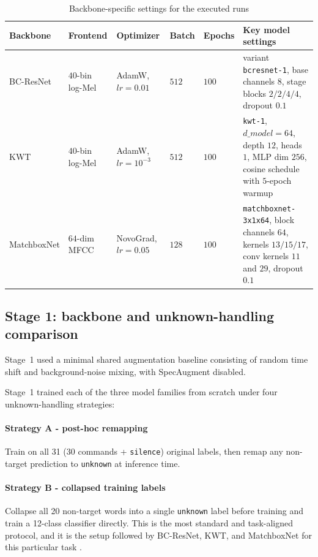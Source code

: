 \documentclass[11pt]{article}
\begin{document}
\begin{table}[t!]
\centering
\caption{Backbone-specific settings for the executed runs}
\label{tab:backbone-settings}
\smallskip
\small
\begin{tabularx}{\textwidth}{@{}l l l l l >{\raggedright\arraybackslash}X@{}}
\toprule
\textbf{Backbone} & \textbf{Frontend} & \textbf{Optimizer} & \textbf{Batch} & \textbf{Epochs} & \textbf{Key model settings}\\
\midrule
BC-ResNet & \(40\)-bin log-Mel & AdamW, \(lr=0.01\) & \(512\) & \(100\) & variant \texttt{bcresnet-1}, base channels \(8\), stage blocks \(2/2/4/4\), dropout \(0.1\) \\
\midrule
KWT & \(40\)-bin log-Mel & AdamW, \(lr=10^{-3}\) & \(512\) & \(100\) & \texttt{kwt-1}, \(d\_model=64\), depth \(12\), heads \(1\), MLP dim \(256\), cosine schedule with \(5\)-epoch warmup \\
\midrule
MatchboxNet & \(64\)-dim MFCC & NovoGrad, \(lr=0.05\) & \(128\) & \(100\) & \texttt{matchboxnet-3x1x64}, block channels \(64\), kernels \(13/15/17\), conv kernels \(11\) and \(29\), dropout \(0.1\) \\
\bottomrule
\end{tabularx}
\end{table}


\subsection*{Stage 1: backbone and unknown-handling comparison}
Stage~1 used a minimal shared augmentation baseline consisting of random time shift and background-noise mixing, with SpecAugment disabled.

Stage~1 trained each of the three model families from scratch under four unknown-handling strategies:


\paragraph*{Strategy A - post-hoc remapping}

Train on all 31 (30 commands + \texttt{silence}) original labels, then remap any non-target prediction to \texttt{unknown} at inference time.

\paragraph*{Strategy B - collapsed training labels}

Collapse all 20 non-target words into a single \texttt{unknown} label before training and train a 12-class classifier directly. This is the most standard and task-aligned protocol, and it is the setup followed by BC-ResNet, KWT, and MatchboxNet for this particular task \cite{bcresnet,kwt,matchbox}.
\end{document}
